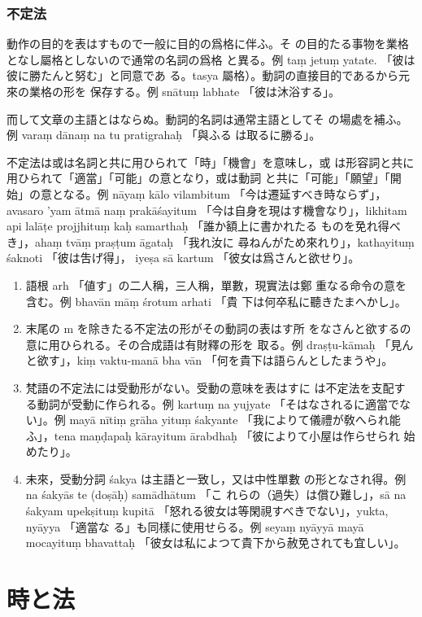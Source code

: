 \subsubsection{不定法}
\numberParagraph
動作の目的を表はすもので一般に目的の爲格に伴ふ。そ
の目的たる事物を業格となし屬格としないので通常の名詞の爲格
と異る。例 taṃ jetuṃ yatate. 「彼は彼に勝たんと努む」と同意であ
る。tasya 屬格）。動詞の直接目的であるから元來の業格の形を
保存する。例 snātuṃ labhate 「彼は沐浴する」。

而して文章の主語とはならぬ。動詞的名詞は通常主語としてそ
の場處を補ふ。例 varaṃ dānaṃ na tu pratigrahaḥ 「與ふる
は取るに勝る」。

不定法は或は名詞と共に用ひられて「時」「機會」を意味し，或
は形容詞と共に用ひられて「適當」「可能」の意となり，或は動詞
と共に「可能」「願望」「開始」の意となる。例 nāyaṃ kālo
vilambitum 「今は遷延すべき時ならず」，avasaro 'yam ātmā\-%
naṃ prakāśayitum 「今は自身を現はす機會なり」，likhitam
api lalāṭe projjhituṃ kaḥ samarthaḥ 「誰か額上に書かれたる
ものを免れ得べき」，ahaṃ tvāṃ praṣṭum āgataḥ 「我れ汝に
尋ねんがため來れり」，kathayituṃ śaknoti 「彼は吿げ得」，
iyeṣa sā kartum 「彼女は爲さんと欲せり」。

\begin{enumerate}[label=(\alph*)]
\item 語根 arh 「値す」の二人稱，三人稱，單數，現實法は鄭
重なる命令の意を含む。例 bhavān māṃ śrotum arhati 「貴
下は何卒私に聽きたまへかし」。
\item 末尾の m を除きたる不定法の形がその動詞の表はす所
をなさんと欲するの意に用ひられる。その合成語は有財釋の形を
取る。例 draṣṭu-kāmaḥ 「見んと欲す」，kiṃ vaktu-manā bha\-%
vān 「何を貴下は語らんとしたまうや」。
\item 梵語の不定法には受動形がない。受動の意味を表はすに
は不定法を支配する動詞が受動に作られる。例 kartuṃ na
yujyate 「そはなされるに適當でない」。例 mayā nītiṃ grāha\-%
yituṃ śakyante 「我によりて儀禮が敎へられ能ふ」，tena
maṇḍapaḥ kārayitum ārabdhaḥ 「彼によりて小屋は作らせられ
始めたり」。
\item 未來，受動分詞 śakya は主語と一致し，又は中性單數
の形となされ得。例 na śakyās te (doṣāḥ) samādhātum 「こ
れらの（過失）は償ひ難し」，sā na śakyam upekṣituṃ kupitā
「怒れる彼女は等閑視すべきでない」，yukta, nyāyya 「適當な
る」も同樣に使用せらる。例 seyaṃ nyāyyā mayā mocayituṃ
bhavattaḥ 「彼女は私によつて貴下から赦免されても宜しい」。
\end{enumerate}

\section{時と法}
